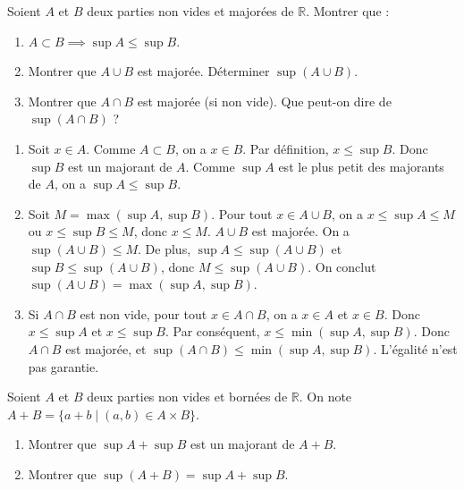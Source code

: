 \documentclass[solutions]{exercices}
\begin{document}
\begin{exercice}
Soient $A$ et $B$ deux parties non vides et majorées de $\mathbb{R}$. Montrer que :
\begin{enumerate}
	\item $A \subset B \implies \sup A \le \sup B$.
	\item Montrer que $A \cup B$ est majorée. Déterminer $\sup(A \cup B)$.
	\item Montrer que $A \cap B$ est majorée (si non vide). Que peut-on dire de $\sup(A \cap B)$ ?
\end{enumerate}
\end{exercice}

\begin{solution}
\begin{enumerate}
	\item Soit $x \in A$. Comme $A \subset B$, on a $x \in B$. Par définition, $x \le \sup B$. Donc $\sup B$ est un majorant de $A$. Comme $\sup A$ est le plus petit des majorants de $A$, on a $\sup A \le \sup B$.
	\item Soit $M = \max(\sup A, \sup B)$. Pour tout $x \in A \cup B$, on a $x \le \sup A \le M$ ou $x \le \sup B \le M$, donc $x \le M$. $A \cup B$ est majorée. On a $\sup(A \cup B) \le M$. De plus, $\sup A \le \sup(A \cup B)$ et $\sup B \le \sup(A \cup B)$, donc $M \le \sup(A \cup B)$. On conclut $\sup(A \cup B) = \max(\sup A, \sup B)$.
	\item Si $A \cap B$ est non vide, pour tout $x \in A \cap B$, on a $x \in A$ et $x \in B$. Donc $x \le \sup A$ et $x \le \sup B$. Par conséquent, $x \le \min(\sup A, \sup B)$. Donc $A \cap B$ est majorée, et $\sup(A \cap B) \le \min(\sup A, \sup B)$. L'égalité n'est pas garantie.
\end{enumerate}
\end{solution}

\begin{exercice}
Soient $A$ et $B$ deux parties non vides et bornées de $\mathbb{R}$. On note $A+B = \{a+b \mid (a,b) \in A \times B\}$.
\begin{enumerate}
	\item Montrer que $\sup A + \sup B$ est un majorant de $A+B$.
	\item Montrer que $\sup(A+B) = \sup A + \sup B$.
\end{enumerate}
\end{exercice}
\end{document}
